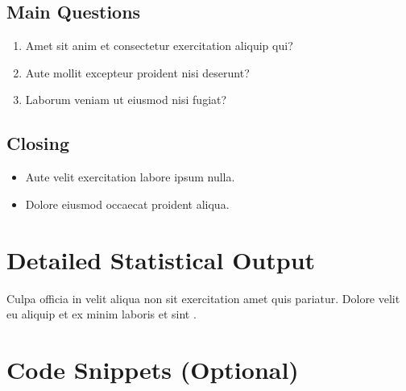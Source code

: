 \begin{theappendices}
  \section{Main Questions}
  \begin{enumerate}
    \item Amet sit anim et consectetur exercitation aliquip qui?
    \item Aute mollit excepteur proident nisi deserunt?
    \item Laborum veniam ut eiusmod nisi fugiat?
  \end{enumerate}

  \section{Closing}
  \begin{itemize}
    \item Aute velit exercitation labore ipsum nulla.
    \item Dolore eiusmod occaecat proident aliqua.
  \end{itemize}

  \chapter{Detailed Statistical Output}
  \label{app:stats_output}

  Culpa officia in velit aliqua non sit exercitation amet quis pariatur. Dolore velit eu aliquip et ex minim laboris et sint \textcite{placeholderArticle2023}.

  \begin{table}[h]
    \centering
    \caption{Example Detailed ANOVA Results for Variable Y}
    \label{tab:appendix_anova}
  \end{table}

  \chapter{Code Snippets (Optional)}
  \label{app:code}


\end{theappendices}
